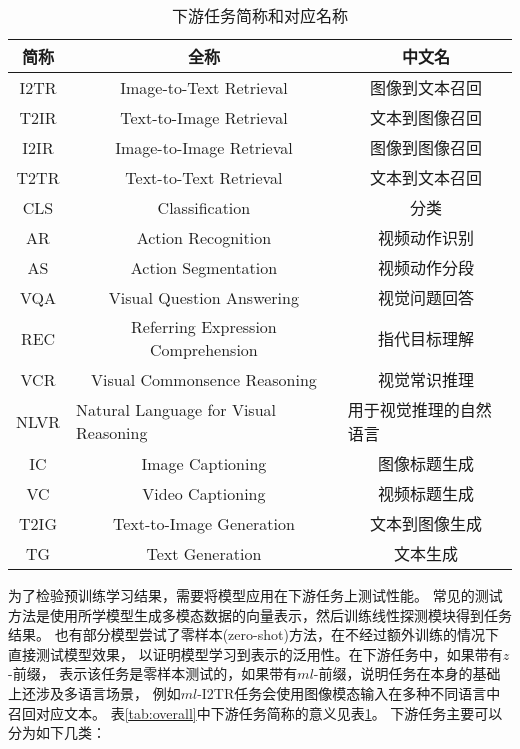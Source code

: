 \begin{table}[]
\begin{tabular}{c|c|c}
\hline
简称 & 全称 & 中文名 \\ \hline
I2TR & Image-to-Text Retrieval & 图像到文本召回 \\
T2IR & Text-to-Image Retrieval & 文本到图像召回 \\
I2IR & Image-to-Image Retrieval & 图像到图像召回 \\
T2TR & Text-to-Text Retrieval & 文本到文本召回 \\
CLS & Classification & 分类 \\
AR & Action Recognition & 视频动作识别 \\
AS & Action Segmentation & 视频动作分段 \\
VQA & Visual Question Answering & 视觉问题回答 \\
REC & Referring Expression Comprehension & 指代目标理解 \\
VCR & Visual Commonsence Reasoning & 视觉常识推理 \\
NLVR & \multicolumn{1}{l|}{Natural Language for Visual Reasoning} & \multicolumn{1}{l}{用于视觉推理的自然语言} \\
IC & Image Captioning & 图像标题生成 \\
VC & Video Captioning & 视频标题生成 \\
T2IG & Text-to-Image Generation & 文本到图像生成 \\
TG & Text Generation & 文本生成 \\
\hline
\end{tabular}
\caption{下游任务简称和对应名称}
\label{tab:downstream}
\end{table}

为了检验预训练学习结果，需要将模型应用在下游任务上测试性能。
常见的测试方法是使用所学模型生成多模态数据的向量表示，然后训练线性探测模块得到任务结果。
也有部分模型尝试了零样本(zero-shot)方法，在不经过额外训练的情况下直接测试模型效果，
以证明模型学习到表示的泛用性。在下游任务中，如果带有$z$-前缀，
表示该任务是零样本测试的，如果带有$ml$-前缀，说明任务在本身的基础上还涉及多语言场景，
例如$ml$-I2TR任务会使用图像模态输入在多种不同语言中召回对应文本。
表\ref{tab:overall}中下游任务简称的意义见表\ref{tab:downstream}。
下游任务主要可以分为如下几类：

